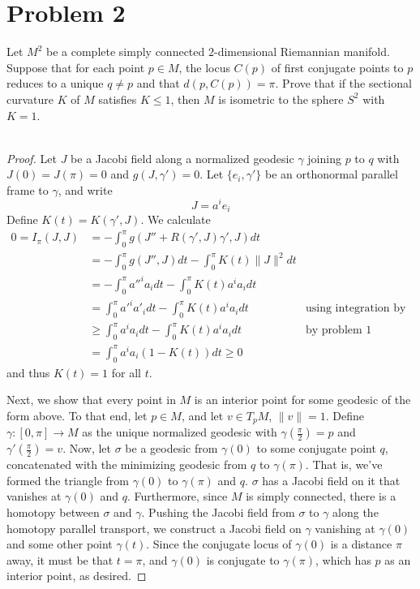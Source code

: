 \documentclass[fontsize=11pt]{scrartcl} %
\numberwithin{equation}{section} %
\numberwithin{figure}{section} %
\numberwithin{table}{section} %
\begin{document}
\section*{Problem 2}
Let $M^2$ be a complete simply connected $2$-dimensional Riemannian manifold.
Suppose that for each point $p\in M$, the locus $C(p)$ of first conjugate points
to $p$ reduces to a unique $q\neq p$ and that $d(p,C(p))=\pi$. Prove that if the
sectional curvature $K$ of $M$ satisfies $K\leq 1$, then $M$ is isometric to the
sphere $S^2$ with $K=1$.
\\
\\
\begin{proof}
    Let $J$ be a Jacobi field along a normalized geodesic $\gamma$ joining $p$
    to $q$ with $J(0)=J(\pi)=0$ and $g(J,\gamma')=0$. Let $\{e_i,\gamma'\}$ be
    an orthonormal parallel frame to $\gamma$, and write
    \[
        J = a^ie_i
    \]
    Define $K(t) = K(\gamma',J)$. We calculate
    \[
\begin{aligned}
    0 = I_{\pi}(J,J) &= -\int_0^{\pi}g(J'' + R(\gamma',J)\gamma',J)dt\\
    &= -\int_0^{\pi}g(J'',J)dt -\int_0^{\pi}K(t)\|J\|^2dt\\
    &= -\int_0^{\pi}a''^ia_idt - \int_0^{\pi}K(t)a^ia_idt\\
    &= \int_0^{\pi}a'^ia'_idt - \int_0^{\pi}K(t)a^ia_idt &\text{using
    integration by parts}\\
    &\geq \int_0^{\pi}a^ia_idt - \int_0^{\pi}K(t)a^ia_idt &\text{by problem 1}\\
    &=\int_0^{\pi}a^ia_i(1-K(t))dt\geq 0
\end{aligned}
    \]
    and thus $K(t)=1$ for all $t$.

    Next, we show that every point in $M$ is an interior point for some geodesic
    of the form above.
    To that end, let $p\in M$, and let $v\in T_pM$, $\|v\|=1$. Define
    $\gamma:[0,\pi]\to M$ as the unique normalized geodesic with
    $\gamma(\frac{\pi}{2})=p$ and $\gamma'(\frac{\pi}{2})=v$. Now, let $\sigma$
    be a geodesic from $\gamma(0)$ to some conjugate point $q$, concatenated
    with the minimizing geodesic from $q$ to $\gamma(\pi)$. That is, we've
    formed the triangle from $\gamma(0)$ to $\gamma(\pi)$ and $q$. $\sigma$ has
    a Jacobi field on it that vanishes at $\gamma(0)$ and $q$. Furthermore,
    since $M$ is simply connected, there is a homotopy between $\sigma$ and
    $\gamma$. Pushing the Jacobi field from $\sigma$ to $\gamma$ along the
    homotopy parallel transport, we construct a Jacobi field on $\gamma$
    vanishing at $\gamma(0)$ and some other point $\gamma(t)$. Since the
    conjugate locus of $\gamma(0)$ is a distance $\pi$ away, it must be that
    $t=\pi$, and $\gamma(0)$ is conjugate to $\gamma(\pi)$, which has $p$ as an
    interior point, as desired.
\end{proof}
\end{document}
